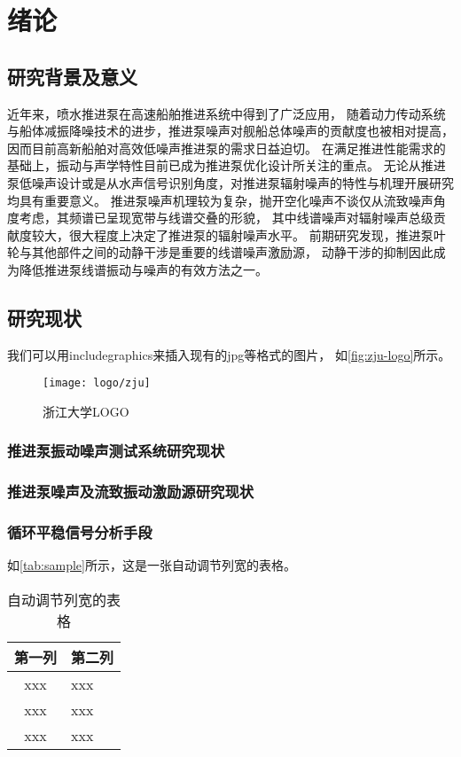 \chapter{绪论}
\section{研究背景及意义}

近年来，喷水推进泵在高速船舶推进系统中得到了广泛应用，
随着动力传动系统与船体减振降噪技术的进步，推进泵噪声对舰船总体噪声的贡献度也被相对提高，
因而目前高新船舶对高效低噪声推进泵的需求日益迫切。
在满足推进性能需求的基础上，振动与声学特性目前已成为推进泵优化设计所关注的重点。
无论从推进泵低噪声设计或是从水声信号识别角度，对推进泵辐射噪声的特性与机理开展研究均具有重要意义。
推进泵噪声机理较为复杂，抛开空化噪声不谈仅从流致噪声角度考虑，其频谱已呈现宽带与线谱交叠的形貌，
其中线谱噪声对辐射噪声总级贡献度较大，很大程度上决定了推进泵的辐射噪声水平。
前期研究发现，推进泵叶轮与其他部件之间的动静干涉是重要的线谱噪声激励源，
动静干涉的抑制因此成为降低推进泵线谱振动与噪声的有效方法之一。


\section{研究现状}

我们可以用includegraphics来插入现有的jpg等格式的图片，
如\autoref{fig:zju-logo}所示。

\begin{figure}[htbp]
    \centering
    \texttt{[image: logo/zju]}
    \caption{\label{fig:zju-logo}浙江大学LOGO}
\end{figure}


\subsection{推进泵振动噪声测试系统研究现状}
\subsection{推进泵噪声及流致振动激励源研究现状}
\subsection{循环平稳信号分析手段}


\par 如\autoref{tab:sample}所示，这是一张自动调节列宽的表格。

\begin{table}[htbp]
    \caption{\label{tab:sample}自动调节列宽的表格}
    \begin{tabularx}{\linewidth}{c|X<{\centering}}
        \hline
        第一列 & 第二列 \\ \hline
        xxx & xxx \\ \hline
        xxx & xxx \\ \hline
        xxx & xxx \\ \hline
    \end{tabularx}
\end{table}


